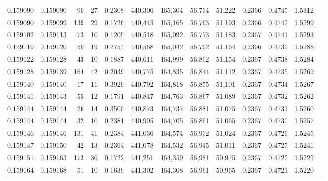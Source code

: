 \begin{tabular}{rrrrrrrrrrrrr}
0.159090 & 0.159090 &    90 &  27 &                                     0.2308 & 440,306 & 165,304 &  56,734 &  51,222 & 0.2366 & 0.4745 & 1.5312 \\
0.159090 & 0.159099 &   139 &  29 &                                     0.1726 & 440,445 & 165,165 &  56,763 &  51,193 & 0.2366 & 0.4742 & 1.5299 \\
0.159102 & 0.159113 &    73 &  10 &                                     0.1205 & 440,518 & 165,092 &  56,773 &  51,183 & 0.2367 & 0.4741 & 1.5293 \\
0.159119 & 0.159120 &    50 &  19 &                                     0.2754 & 440,568 & 165,042 &  56,792 &  51,164 & 0.2366 & 0.4739 & 1.5288 \\
0.159122 & 0.159128 &    43 &  10 &                                     0.1887 & 440,611 & 164,999 &  56,802 &  51,154 & 0.2367 & 0.4738 & 1.5284 \\
0.159128 & 0.159139 &   164 &  42 &                                     0.2039 & 440,775 & 164,835 &  56,844 &  51,112 & 0.2367 & 0.4735 & 1.5269 \\
0.159140 & 0.159140 &    17 &  11 &                                     0.3929 & 440,792 & 164,818 &  56,855 &  51,101 & 0.2367 & 0.4734 & 1.5267 \\
0.159141 & 0.159143 &    55 &  12 &                                     0.1791 & 440,847 & 164,763 &  56,867 &  51,089 & 0.2367 & 0.4732 & 1.5262 \\
0.159144 & 0.159144 &    26 &  14 &                                     0.3500 & 440,873 & 164,737 &  56,881 &  51,075 & 0.2367 & 0.4731 & 1.5260 \\
0.159144 & 0.159144 &    32 &  10 &                                     0.2381 & 440,905 & 164,705 &  56,891 &  51,065 & 0.2367 & 0.4730 & 1.5257 \\
0.159146 & 0.159146 &   131 &  41 &                                     0.2384 & 441,036 & 164,574 &  56,932 &  51,024 & 0.2367 & 0.4726 & 1.5245 \\
0.159147 & 0.159150 &    42 &  13 &                                     0.2364 & 441,078 & 164,532 &  56,945 &  51,011 & 0.2367 & 0.4725 & 1.5241 \\
0.159151 & 0.159163 &   173 &  36 &                                     0.1722 & 441,251 & 164,359 &  56,981 &  50,975 & 0.2367 & 0.4722 & 1.5225 \\
0.159164 & 0.159168 &    51 &  10 &                                     0.1639 & 441,302 & 164,308 &  56,991 &  50,965 & 0.2367 & 0.4721 & 1.5220 \\

\end{tabular}
